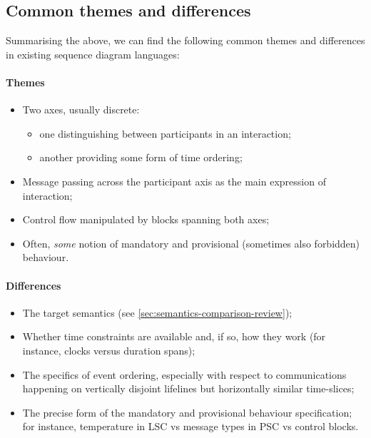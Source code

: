 \subsection{Common themes and differences}

Summarising the above, we can find the following common
themes and differences in existing sequence
diagram languages:

\paragraph{Themes}

\begin{itemize}
\item
	Two axes, usually discrete:
	\begin{itemize}
		\item
			one distinguishing between participants in an interaction;
		\item
			another providing some form of time ordering;
	\end{itemize}
\item
	Message passing across the participant axis as the main expression of
	interaction;
\item
	Control flow manipulated by blocks 
	spanning both axes;
\item
  Often, \emph{some} notion of mandatory and provisional
  (sometimes also forbidden) behaviour.
\end{itemize}

\paragraph{Differences}

\begin{itemize}
\item
	The target semantics (see \cref{sec:semantics-comparison-review});
\item
	Whether time constraints are available and, if so, how they work
	(for instance, clocks versus duration spans);
\item
	The specifics of event ordering, especially with respect to communications
	happening on vertically disjoint lifelines but horizontally
	similar time-slices;
\item
	The precise form of the mandatory and provisional
	behaviour specification; for instance, temperature in LSC
	vs message types in PSC vs control blocks.
\end{itemize}

